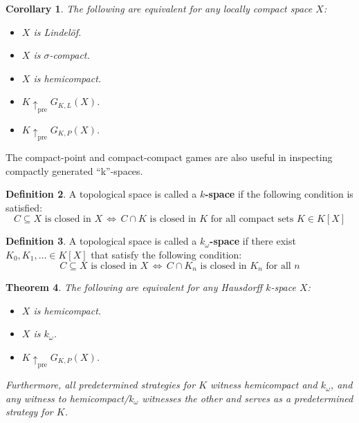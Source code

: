 \documentclass[11pt]{article}
\theoremstyle{plain}
\newtheorem{theorem}{Theorem}
\newtheorem{corollary}[theorem]{Corollary}
\theoremstyle{definition}
\newtheorem{definition}[theorem]{Definition}
\theoremstyle{remark}
\newcommand{\prewin}{\uparrow_{\text{pre}}}
\begin{document}
\begin{corollary}
The following are equivalent for any locally compact space $X$:
  \begin{itemize}
  \item $X$ is Lindel\"of.
  \item $X$ is $\sigma$-compact.
  \item $X$ is hemicompact.
  \item $K \prewin G_{K,L}(X)$.
  \item $K \prewin G_{K,P}(X)$.
  \end{itemize}
\end{corollary}

The compact-point and compact-compact games are also useful in inspecting compactly generated ``k''-spaces.

\begin{definition}
A topological space is called a \textbf{$k$-space} if the following condition is satisfied: \[C \subseteq X \text{ is closed in } X\, \Leftrightarrow \, C\cap K \text{ is closed in } K \text{ for all compact sets } K\in K[X]\]
\end{definition}

\begin{definition}
A topological space is called a \textbf{$k_\omega$-space} if there exist $K_0,K_1,\dots \in K[X]$ that satisfy the following condition: \[C \subseteq X \text{ is closed in } X\, \Leftrightarrow \, C \cap K_n \text{ is closed in } K_n \text{ for all } n\]
\end{definition}

\begin{theorem}
The following are equivalent for any Hausdorff $k$-space $X$:
  \begin{itemize}
  \item $X$ is hemicompact.
  \item $X$ is $k_{\omega}$.
  \item $K \prewin G_{K,P}(X)$.
  \end{itemize}
Furthermore, all predetermined strategies for $K$ witness hemicompact and $k_\omega$, and any witness to hemicompact/$k_\omega$ witnesses the other and serves as a predetermined strategy for $K$.
\end{theorem}
\end{document}
